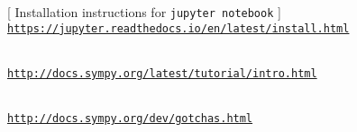 {[ Installation instructions for \texttt{jupyter notebook} ] \\ 
\href{https://jupyter.readthedocs.io/en/latest/install.html}
	{\texttt{https://jupyter.readthedocs.io/en/latest/install.html}}

\medskip
{} \\ 
\href{http://docs.sympy.org/latest/tutorial/intro.html}{\texttt{http://docs.sympy.org/latest/tutorial/intro.html}}

\medskip
{} \\ 
\href{http://docs.sympy.org/dev/gotchas.html}{\texttt{http://docs.sympy.org/dev/gotchas.html}}



}



